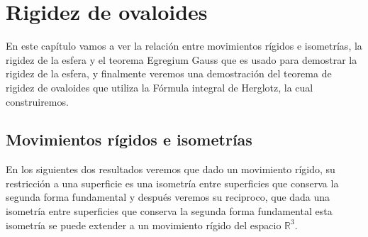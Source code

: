 \chapter{Rigidez de ovaloides}





${ }$\\

En este capítulo vamos a ver la relación entre movimientos rígidos e isometrías, la rigidez de la esfera y el teorema Egregium Gauss que es usado para demostrar la rigidez de la esfera, y finalmente veremos una demostración del teorema de rigidez de ovaloides que utiliza la Fórmula integral de Herglotz, la cual construiremos.
${ }$\\


	${ }$\\
\section{Movimientos rígidos e isometrías}
	${ }$\\

En los siguientes dos resultados veremos que dado un movimiento rígido, su restricción a una superficie es una isometría entre superficies que conserva la segunda forma fundamental y después veremos su reciproco, que dada una isometría entre superficies que conserva la segunda forma fundamental esta isometría se puede extender a un movimiento rígido del espacio $\mathbb{R}^3$.
${ }$\\

